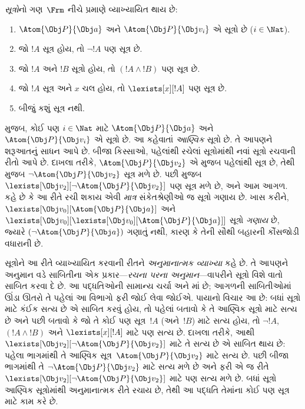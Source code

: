 \begin{defn}
\emph{સૂત્રો}નો ગણ~$\Frm$ નીચે પ્રમાણે વ્યાખ્યાયિત થાય છે:
\begin{enumerate}
\item{} $\Atom{\Obj P}{\Obj a}$ અને $\Atom{\Obj
  P}{\Obj v_i}$ એ સૂત્રો છે ($i \in \Nat$).

\item {}જો $!A$ સૂત્ર હોય, તો $\lnot !A$
  પણ સૂત્ર છે.

\item જો $!A$ અને $!B$ સૂત્રો હોય, તો $(!A \land
  !B)$ પણ સૂત્ર છે.

\item {}જો $!A$ સૂત્ર અને $x$ ચલ
  હોય, તો $\lexists[x][!A]$ પણ સૂત્ર છે.

\item {}બીજું કશું સૂત્ર નથી.
\end{enumerate}
\end{defn}

 મુજબ, કોઈ પણ $i \in \Nat$ માટે $\Atom{\Obj P}{\Obj
a}$ અને $\Atom{\Obj P}{\Obj v_i}$ એ સૂત્રો છે. આ કહેવાતાં
\emph{આણ્વિક} સૂત્રો છે. તે આપણને શરૂઆતનું સાધન આપે છે. બીજા
કિસ્સાઓ, પહેલાંથી રચેલાં સૂત્રોમાંથી નવાં સૂત્રો રચવાની
રીતો આપે છે. દાખલા તરીકે, $\Atom{\Obj P}{\Obj v_2}$ એ
 મુજબ પહેલાંથી સૂત્ર છે, તેથી
 મુજબ $\lnot \Atom{\Obj P}{\Obj v_2}$ સૂત્ર
મળે છે. પછી  મુજબ $\lexists[\Obj v_2][\lnot
\Atom{\Obj P}{\Obj v_2}]$ પણ સૂત્ર મળે છે, અને આમ આગળ.
 કહે છે કે આ રીતે રચી શકાય એવી \emph{માત્ર}
સંકેતશ્રેણીઓ જ સૂત્રો ગણાય છે. ખાસ કરીને,
$\lexists[\Obj v_0][\Atom{\Obj P}{\Obj a}]$ અને $\lexists[\Obj
v_0][\lexists[\Obj v_0][\Atom{\Obj P}{\Obj a}]]$ સૂત્રો
\emph{ગણાય} છે, જ્યારે $(\lnot \Atom{\Obj P}{\Obj a})$ ગણાતું નથી,
કારણ કે તેની સૌથી બહારની કૌંસજોડી વધારાની છે.

સૂત્રોને આ રીતે વ્યાખ્યાયિત કરવાની રીતને \emph{અનુમાનાત્મક
વ્યાખ્યા} કહે છે. તે આપણને અનુમાન વડે સાબિતીના એક પ્રકાર---\emph{રચના
પરના અનુમાન}---વાપરીને સૂત્રો વિશે વાતો સાબિત કરવા દે છે.
આ પદ્ધતિઓની સામાન્ય ચર્ચા  અને
માં છે; આગળની સાબિતીઓમાં ઊંડા ઊતરો તે પહેલાં
આ વિભાગો ફરી જોઈ લેવા જોઈએ. પાયાનો વિચાર આ છે: બધાં સૂત્રો માટે
કંઈક સત્ય છે એ સાબિત કરવું હોય, તો પહેલાં બતાવો કે તે આણ્વિક
સૂત્રો માટે સત્ય છે અને પછી બતાવો કે જો તે કોઈ પણ
સૂત્ર~$!A$ (અને~$!B$) માટે સત્ય હોય, તો $\lnot !A$, $(!A \land
!B)$ અને $\lexists[x][!A]$ માટે પણ સત્ય છે. દાખલા તરીકે, આથી
$\lexists[\Obj v_2][\lnot \Atom{\Obj P}{\Obj v_2}]$ માટે તે સત્ય છે
એ સાબિત થાય છે: પહેલા ભાગમાંથી તે આણ્વિક સૂત્ર~$\Atom{\Obj
P}{\Obj v_2}$ માટે સત્ય છે. પછી બીજા ભાગમાંથી તે $\lnot \Atom{\Obj
P}{\Obj v_2}$ માટે સત્ય મળે છે અને ફરી એ જ રીતે
$\lexists[\Obj v_2][\lnot \Atom{\Obj P}{\Obj v_2}]$ માટે પણ સત્ય મળે
છે. બધાં સૂત્રો આણ્વિક સૂત્રોમાંથી અનુમાનાત્મક રીતે રચાય
છે, તેથી આ પદ્ધતિ તેમાંના કોઈ પણ સૂત્ર માટે કામ કરે છે.
\endgroup


